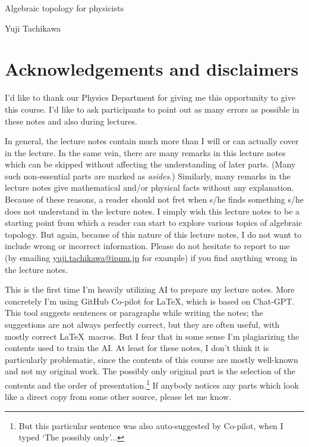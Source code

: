 \documentclass[12pt]{article}
\numberwithin{equation}{section}
\theoremstyle{remark}
\begin{document}
\centerline{\Large Algebraic topology for physicists}

\bigskip

\centerline{\large Yuji Tachikawa}

\setcounter{tocdepth}{2}
\tableofcontents

\newpage



\section*{Acknowledgements and disclaimers}

I'd like to thank our Physics Department for giving me this opportunity to give this course.
I'd like to ask participants to point out as many errors as possible in these notes and also during lectures.

In general, the lecture notes contain much more than I will or can actually cover in the lecture. 
In the same vein, there are many remarks in this lecture notes which can be skipped without affecting the understanding of later parts. 
(Many such non-essential parts are marked as \emph{asides}.)
Similarly, many remarks in the lecture notes  give mathematical and/or physical facts without any explanation.
Because of these reasons, a reader should not fret  when s/he finds something s/he does not understand in the lecture notes.
I simply wish this lecture notes to be a starting point from which a reader can start to explore various topics of algebraic topology.
But again, because of this nature of this lecture notes, I do not want to include wrong or incorrect information. 
Please do not hesitate to report to me (by emailing \url{yuji.tachikawa@ipmu.jp} for example) if you find anything wrong in the lecture notes.

This is the first time I'm heavily utilizing AI to prepare my lecture notes.
More concretely I'm using GitHub Co-pilot for \LaTeX, which is based on Chat-GPT.
This tool suggests sentences or paragraphs while writing the notes;
the suggestions are not always perfectly correct, but they are often useful,
with mostly correct \LaTeX\ macros.
But I fear that in some sense I'm plagiarizing the contents used to train the AI.
At least for these notes, I don't think it is particularly problematic,
since the contents of this course are mostly well-known and not my original work.
The possibly only original part is the selection of the contents and the order of presentation.\footnote{%
But this particular sentence was also auto-suggested by Co-pilot, when I typed `The possibly only'...
}
If anybody notices any parts which look like a direct copy from some other source, please let me know.
\end{document}
